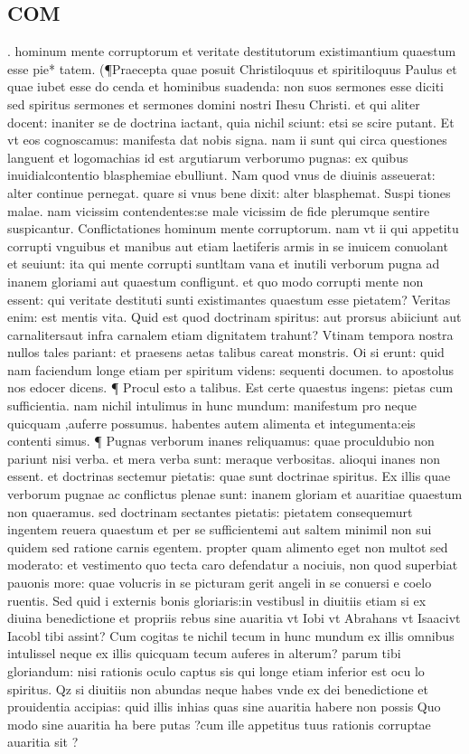 \documentclass{article}
\begin{document}
\begin{pages}
\section*{COM }
\marginpar{[ p.6 ]}\pstart . hominum mente corruptorum et veritate destitutorum existimantium quaestum esse pie* tatem. (¶Praecepta quae posuit Christiloquus et spiritiloquus Paulus et quae iubet esse do cenda et hominibus suadenda: non suos sermones esse diciti sed spiritus sermones et sermones domini nostri Ihesu Christi. et qui aliter docent: inaniter se de doctrina iactant, quia nichil sciunt: etsi se scire putant. Et vt eos cognoscamus: manifesta dat nobis signa. nam ii sunt qui circa questiones languent et logomachias id est argutiarum verborumo pugnas: ex quibus inuidialcontentio blasphemiae ebulliunt. Nam quod vnus de diuinis asseuerat: alter continue pernegat. quare si vnus bene dixit: alter blasphemat. Suspi tiones malae. nam vicissim contendentes:se male vicissim de fide plerumque sentire suspicantur. Conflictationes hominum mente corruptorum. nam vt ii qui appetitu corrupti vnguibus et manibus aut etiam laetiferis armis in se inuicem conuolant et seuiunt: ita qui mente corrupti suntltam vana et inutili verborum pugna ad inanem gloriami aut quaestum confligunt. et quo modo corrupti mente non essent: qui veritate destituti sunti existimantes quaestum esse pietatem? Veritas enim: est mentis vita. Quid est quod doctrinam spiritus: aut prorsus abiiciunt aut carnalitersaut infra carnalem etiam dignitatem trahunt? Vtinam tempora nostra nullos tales pariant: et praesens aetas talibus careat monstris. Oi si erunt: quid nam faciendum longe etiam per spiritum videns: sequenti documen. to apostolus nos edocer dicens. ¶ Procul esto a talibus. Est certe quaestus ingens: pietas cum sufficientia. nam nichil intulimus in hunc mundum: manifestum pro neque quicquam ,auferre possumus. habentes autem alimenta et integumenta:eis contenti simus. ¶ Pugnas verborum inanes reliquamus: quae proculdubio non pariunt nisi verba. et mera verba sunt: meraque verbositas. alioqui inanes non essent. et doctrinas sectemur pietatis: quae sunt doctrinae spiritus. Ex illis quae verborum pugnae ac conflictus plenae sunt: inanem gloriam et auaritiae quaestum non quaeramus. sed doctrinam sectantes pietatis: pietatem consequemurt ingentem reuera quaestum et per se sufficientemi aut saltem minimil non sui quidem sed ratione carnis egentem. propter quam alimento eget non multot sed moderato: et vestimento quo tecta caro defendatur a nociuis, non quod superbiat pauonis more: quae volucris in se picturam gerit angeli in se conuersi e coelo ruentis. Sed quid i externis bonis gloriaris:in vestibusl in diuitiis etiam si ex diuina benedictione et propriis rebus sine auaritia vt Iobi vt Abrahans vt Isaacivt Iacobl tibi assint? Cum cogitas te nichil tecum in hunc mundum ex illis omnibus intulissel neque ex illis quicquam tecum auferes in alterum? parum tibi gloriandum: nisi rationis oculo captus sis qui longe etiam inferior est ocu lo spiritus. Qz si diuitiis non abundas neque habes vnde ex dei benedictione et prouidentia accipias: quid illis inhias quas sine auaritia habere non possis Quo modo sine auaritia ha bere putas ?cum ille appetitus tuus rationis corruptae auaritia sit ? 
\end{pages}
\end{document}
